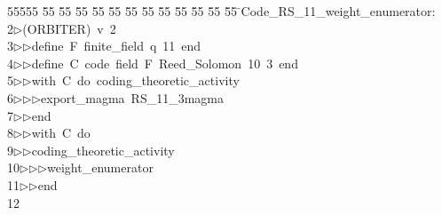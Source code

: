 %
%
\begin{tabbing}
55555 \= 55 \= 55 \= 55 \= 55 \= 55 \= 55 \= 55 \= 55 \= 55 \= 55 \= 55 \= 55 \= \>Code\_RS\_11\_weight\_enumerator:\\[0pt]
2\>$\triangleright$\>(ORBITER)\ v\ 2\ \\[0pt]
3\>$\triangleright$\>$\triangleright$\>define\ F\ finite\_field\ q\ 11\ end\ \\[0pt]
4\>$\triangleright$\>$\triangleright$\>define\ C\ code\ field\ F\ Reed\_Solomon\ 10\ 3\ end\ \\[0pt]
5\>$\triangleright$\>$\triangleright$\>with\ C\ do\ coding\_theoretic\_activity\ \\[0pt]
6\>$\triangleright$\>$\triangleright$\>$\triangleright$\>export\_magma\ RS\_11\_3magma\ \\[0pt]
7\>$\triangleright$\>$\triangleright$\>end\ \\[0pt]
8\>$\triangleright$\>$\triangleright$\>with\ C\ do\ \\[0pt]
9\>$\triangleright$\>$\triangleright$\>coding\_theoretic\_activity\ \\[0pt]
10\>$\triangleright$\>$\triangleright$\>$\triangleright$\>weight\_enumerator\ \\[0pt]
11\>$\triangleright$\>$\triangleright$\>end\\[0pt]
12\>\end{tabbing}
